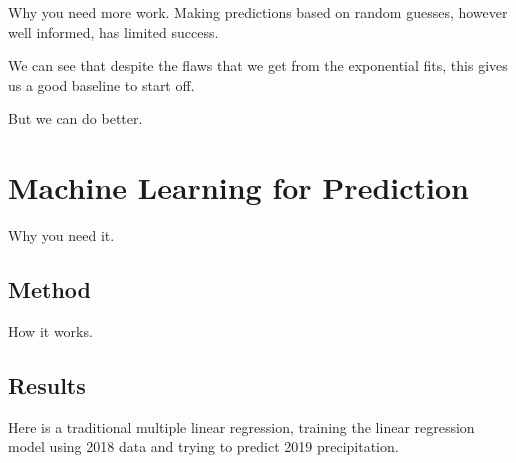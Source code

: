 \documentclass[11pt]{report}
\begin{document}
Why you need more work. Making predictions based on random guesses, however
well informed, has limited success.

We can see that despite the flaws that we get from the exponential fits,
this gives us a good baseline to start off.


But we can do better. 

\clearpage

\section{Machine Learning for Prediction}\label{sec:MLP}






Why you need it. 

\subsection{Method}

How it works.


\subsection{Results}

Here is a traditional multiple linear regression, training the linear
regression model using 2018 data and trying to predict 2019 precipitation.
\end{document}
